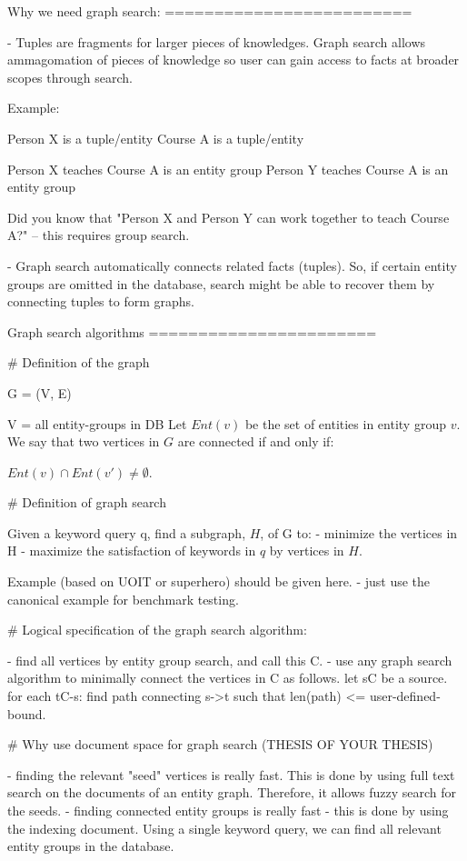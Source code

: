 		Why we need graph search:
		=========================
		
		- Tuples are fragments for larger pieces of knowledges.
		Graph search allows ammagomation of pieces of knowledge so user can gain
		access to facts at broader scopes through search.
		
		Example:
		
		Person X        is a tuple/entity
		Course A        is a tuple/entity
		
		Person X teaches Course A       is an entity group
		Person Y teaches Course A       is an entity group
		
		Did you know that "Person X and Person Y can work together to teach Course
		A?" -- this requires group search.
		
		- Graph search automatically connects related facts (tuples).  So, if certain
		entity groups are omitted in the database, search might be able to recover
		them by connecting tuples to form graphs.
		
		
		Graph search algorithms
		=======================
		
		# Definition of the graph
		
		G = (V, E)
		
		V = all entity-groups in DB
		Let $Ent(v)$ be the set of entities in entity group $v$.
		We say that two vertices in $G$ are connected if and only if:
		
		$Ent(v)\cap Ent(v')\not=\emptyset$.
		
		# Definition of graph search
		
		Given a keyword query q, find a subgraph, $H$, of G to:
		- minimize the vertices in H
		- maximize the satisfaction of keywords in $q$ by vertices in $H$.
		
		Example (based on UOIT or superhero) should be given here.
		- just use the canonical example for benchmark testing.
		
		# Logical specification of the graph search algorithm:
		
		- find all vertices by entity group search, and call this C.
		- use any graph search algorithm to minimally connect the vertices in C
		as follows. 
		let s\in C be a source.
		for each t\in C-{s}:
		find path connecting s->t such that len(path) <= user-defined-bound.
		
		# Why use document space for graph search (THESIS OF YOUR THESIS)
		
		- finding the relevant "seed" vertices is really fast.  This is done by
		using full text search on the documents of an entity graph.  Therefore, it
		allows fuzzy search for the seeds.
		- finding connected entity groups is really fast - this is done by using the
		indexing document.  Using a single keyword query, we can find all relevant
		entity groups in the database.
		
